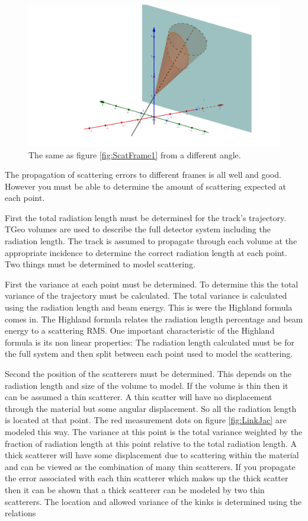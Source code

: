 \begin{figure}[H]
\centering
\includegraphics[width=1.0\linewidth]{figures/prop600GoodOffSensor.png}
\caption{The same as figure \ref{fig:ScatFrame1} from a different angle.}
\label{fig:ScatFrame2}
\end{figure}

The propagation of scattering errors to different frames is all well and good. However you must be able to determine the amount of scattering expected at each point.

First the total radiation length must be determined for the track's trajectory. TGeo volumes are used to describe the full detector system including the radiation length. The track is assumed to propagate through each volume at the appropriate incidence to determine the correct radiation length at each point. Two things must be determined to model scattering.

First the variance at each point must be determined. To determine this the total variance of the trajectory must be calculated. The total variance is calculated using the radiation length and beam energy. This is were the Highland formula comes in. The Highland formula relates the radiation length percentage and beam energy to a scattering RMS. One important characteristic of the Highland formula is its non linear properties: The radiation length calculated must be for the full system and then split between each point used to model the scattering. 

Second the position of the scatterers must be determined. This depends on the radiation length and size of the volume to model. If the volume is thin then it can be assumed a thin scatterer. A thin scatter will have no displacement through the material but some angular displacement. So all the radiation length is located at that point. The red measurement dots on figure \ref{fig:LinkJac} are modeled this way. The variance at this point is the total variance weighted by the fraction of radiation length at this point relative to the total radiation length.
A thick scatterer will have some displacement due to scattering within the material and can be viewed as the combination of many thin scatterers. If you propagate the error associated with each thin scatterer which makes up the thick scatter then it can be shown that a thick scatterer can be modeled by two thin scatterers. The location and allowed variance of the kinks is determined using the relations

